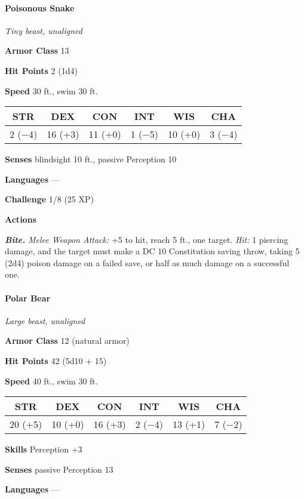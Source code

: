 \documentclass[
]{article}
\begin{document}
\hypertarget{poisonous-snake}{%
\paragraph{Poisonous Snake}\label{poisonous-snake}}

\emph{Tiny beast, unaligned}

\textbf{Armor Class} 13

\textbf{Hit Points} 2 (1d4)

\textbf{Speed} 30 ft., swim 30 ft.

\begin{longtable}[]{@{}cccccc@{}}
\toprule
STR & DEX & CON & INT & WIS & CHA\tabularnewline
\midrule
\endhead
2 (−4) & 16 (+3) & 11 (+0) & 1 (−5) & 10 (+0) & 3 (−4)\tabularnewline
\bottomrule
\end{longtable}

\textbf{Senses} blindsight 10 ft., passive Perception 10

\textbf{Languages} ---

\textbf{Challenge} 1/8 (25 XP)

\textbf{Actions}

\emph{\textbf{Bite.}} \emph{Melee Weapon Attack:} +5 to hit, reach 5
ft., one target. \emph{Hit:} 1 piercing damage, and the target must make
a DC 10 Constitution saving throw, taking 5 (2d4) poison damage on a
failed save, or half as much damage on a successful one.

\hypertarget{polar-bear}{%
\paragraph{Polar Bear}\label{polar-bear}}

\emph{Large beast, unaligned}

\textbf{Armor Class} 12 (natural armor)

\textbf{Hit Points} 42 (5d10 + 15)

\textbf{Speed} 40 ft., swim 30 ft.

\begin{longtable}[]{@{}cccccc@{}}
\toprule
STR & DEX & CON & INT & WIS & CHA\tabularnewline
\midrule
\endhead
20 (+5) & 10 (+0) & 16 (+3) & 2 (−4) & 13 (+1) & 7 (−2)\tabularnewline
\bottomrule
\end{longtable}

\textbf{Skills} Perception +3

\textbf{Senses} passive Perception 13

\textbf{Languages} ---
\end{document}
